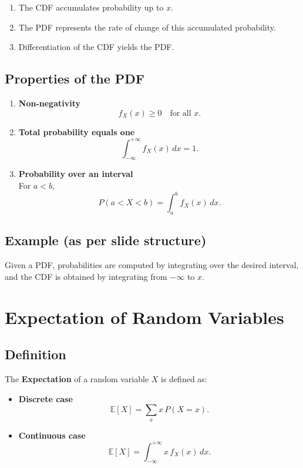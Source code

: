 \documentclass[12pt]{article}
\begin{document}
\begin{enumerate}
    \item The CDF accumulates probability up to $x$.
    \item The PDF represents the rate of change of this accumulated probability.
    \item Differentiation of the CDF yields the PDF.
\end{enumerate}

\subsection{Properties of the PDF}

\begin{enumerate}
    \item \textbf{Non-negativity}
    \[
    f_X(x) \ge 0 \quad \text{for all } x.
    \]

    \item \textbf{Total probability equals one}
    \[
    \int_{-\infty}^{+\infty} f_X(x)\, dx = 1.
    \]

    \item \textbf{Probability over an interval}\\
    For $a < b$,
    \[
    P(a < X < b) = \int_a^b f_X(x)\, dx.
    \]
\end{enumerate}

\subsection{Example (as per slide structure)}

Given a PDF, probabilities are computed by integrating over the desired interval, and the CDF is obtained by integrating from $-\infty$ to $x$.

\section{Expectation of Random Variables}

\subsection{Definition}

The \textbf{Expectation} of a random variable $X$ is defined as:

\begin{itemize}
    \item \textbf{Discrete case}
    \[
    \mathbb{E}[X] = \sum_x x \, P(X = x).
    \]

    \item \textbf{Continuous case}
    \[
    \mathbb{E}[X] = \int_{-\infty}^{+\infty} x \, f_X(x)\, dx.
    \]
\end{itemize}
\end{document}
